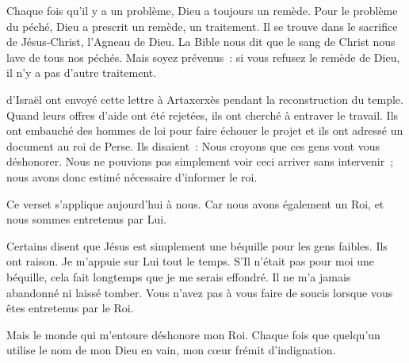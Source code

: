 Chaque fois qu'il y a un problème, Dieu a toujours un remède.
 Pour le problème du péché, Dieu a prescrit un remède, un traitement.
 Il se trouve dans le sacrifice de Jésus-Christ, l'Agneau de Dieu.
 La Bible nous dit que le sang de Christ nous lave de tous nos péchés.
 Mais soyez prévenus~: si vous refusez le remède de Dieu,
 il n'y a pas d'autre traitement. 

\dvrule








 d'Israël ont envoyé cette lettre à Artaxerxès
 pendant la reconstruction du temple.
 Quand leurs offres d'aide ont été rejetées,
 ils ont cherché à entraver le travail.
 Ils ont embauché des hommes de loi pour faire échouer le projet
 et ils ont adressé un document au roi de Perse.
 Ils disaient~: \og Nous croyons que ces gens vont vous déshonorer.
 Nous ne pouvions pas simplement voir ceci arriver sans intervenir~;
 nous avons donc estimé nécessaire d'informer le roi. \fg{}

Ce verset s'applique aujourd'hui à nous. Car nous avons également un Roi,
 et nous sommes entretenus par Lui.

Certains disent que Jésus est simplement une béquille pour les gens faibles.
 Ils ont raison. Je m'appuie sur Lui tout le temps.
 S'Il n'était pas pour moi une béquille,
 cela fait longtemps que je me serais effondré.
 Il ne m'a jamais abandonné ni laissé tomber.
 Vous n'avez pas à vous faire de soucis lorsque vous êtes entretenus par le Roi.

Mais le monde qui m'entoure déshonore mon Roi.
 Chaque fois que quelqu'un utilise le nom de mon Dieu en vain,
 mon cœur frémit d'indignation. 


